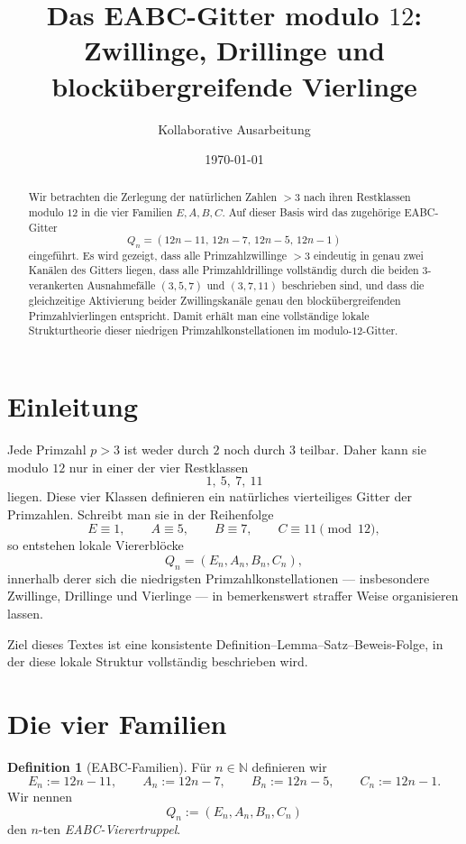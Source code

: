 \documentclass[11pt,a4paper]{article}
\title{Das EABC-Gitter modulo \(12\):\\
	Zwillinge, Drillinge und blockübergreifende Vierlinge}
\author{Kollaborative Ausarbeitung}
\date{\today}
\theoremstyle{definition}
\newtheorem{definition}[satz]{Definition}
\theoremstyle{remark}
\newcommand{\N}{\mathbb{N}}
\begin{document}
	\maketitle
	
	\begin{abstract}
		Wir betrachten die Zerlegung der natürlichen Zahlen \(>3\) nach ihren Restklassen modulo \(12\)
		in die vier Familien \(E,A,B,C\). Auf dieser Basis wird das zugehörige EABC-Gitter
		\[
		Q_n=(12n-11,\,12n-7,\,12n-5,\,12n-1)
		\]
		eingeführt. Es wird gezeigt, dass alle Primzahlzwillinge \(>3\) eindeutig in genau zwei
		Kanälen des Gitters liegen, dass alle Primzahldrillinge vollständig durch die beiden
		\(3\)-verankerten Ausnahmefälle \((3,5,7)\) und \((3,7,11)\) beschrieben sind, und dass die
		gleichzeitige Aktivierung beider Zwillingskanäle genau den blockübergreifenden
		Primzahlvierlingen entspricht. Damit erhält man eine vollständige lokale Strukturtheorie
		dieser niedrigen Primzahlkonstellationen im modulo-\(12\)-Gitter.
	\end{abstract}
	
	\section{Einleitung}
	
	Jede Primzahl \(p>3\) ist weder durch \(2\) noch durch \(3\) teilbar. Daher kann sie modulo \(12\)
	nur in einer der vier Restklassen
	\[
	1,\ 5,\ 7,\ 11
	\]
	liegen. Diese vier Klassen definieren ein natürliches vierteiliges Gitter der Primzahlen.
	Schreibt man sie in der Reihenfolge
	\[
	E \equiv 1,\qquad A \equiv 5,\qquad B \equiv 7,\qquad C \equiv 11 \pmod{12},
	\]
	so entstehen lokale Viererblöcke
	\[
	Q_n=(E_n,A_n,B_n,C_n),
	\]
	innerhalb derer sich die niedrigsten Primzahlkonstellationen --- insbesondere Zwillinge,
	Drillinge und Vierlinge --- in bemerkenswert straffer Weise organisieren lassen.
	
	Ziel dieses Textes ist eine konsistente Definition--Lemma--Satz--Beweis-Folge, in der diese
	lokale Struktur vollständig beschrieben wird.
	
	\section{Die vier Familien}
	
	\begin{definition}[EABC-Familien]
		Für \(n\in\N\) definieren wir
		\[
		E_n:=12n-11,\qquad
		A_n:=12n-7,\qquad
		B_n:=12n-5,\qquad
		C_n:=12n-1.
		\]
		Wir nennen
		\[
		Q_n:=(E_n,A_n,B_n,C_n)
		\]
		den \(n\)-ten \emph{EABC-Vierertruppel}.
	\end{definition}
	
\end{document}
